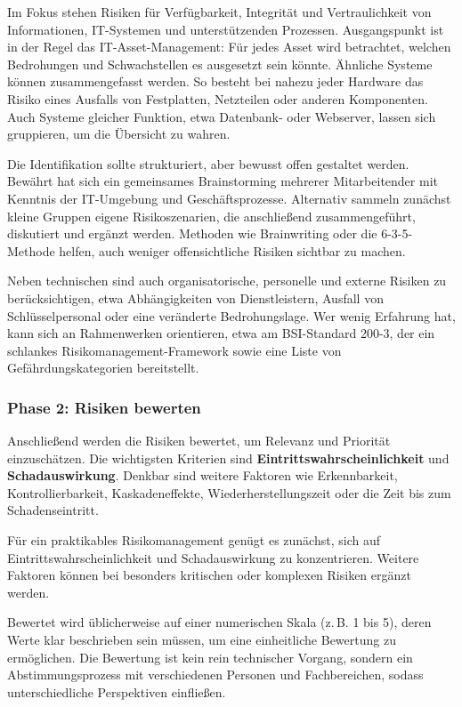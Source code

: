 Im Fokus stehen Risiken für Verfügbarkeit, Integrität und Vertraulichkeit von Informationen, IT-Systemen und unterstützenden Prozessen. Ausgangspunkt ist in der Regel das IT-Asset-Management: Für jedes Asset wird betrachtet, welchen Bedrohungen und Schwachstellen es ausgesetzt sein könnte. Ähnliche Systeme können zusammengefasst werden. So besteht bei nahezu jeder Hardware das Risiko eines Ausfalls von Festplatten, Netzteilen oder anderen Komponenten. Auch Systeme gleicher Funktion, etwa Datenbank- oder Webserver, lassen sich gruppieren, um die Übersicht zu wahren.

Die Identifikation sollte strukturiert, aber bewusst offen gestaltet werden. Bewährt hat sich ein gemeinsames Brainstorming mehrerer Mitarbeitender mit Kenntnis der IT-Umgebung und Geschäftsprozesse. Alternativ sammeln zunächst kleine Gruppen eigene Risikoszenarien, die anschließend zusammengeführt, diskutiert und ergänzt werden. Methoden wie Brainwriting oder die 6-3-5-Methode helfen, auch weniger offensichtliche Risiken sichtbar zu machen.

Neben technischen sind auch organisatorische, personelle und externe Risiken zu berücksichtigen, etwa Abhängigkeiten von Dienstleistern, Ausfall von Schlüsselpersonal oder eine veränderte Bedrohungslage. Wer wenig Erfahrung hat, kann sich an Rahmenwerken orientieren, etwa am BSI-Standard 200-3, der ein schlankes Risikomanagement-Framework sowie eine Liste von Gefährdungskategorien bereitstellt.
\newpage
\subsubsection{Phase 2: Risiken bewerten}
Anschließend werden die Risiken bewertet, um Relevanz und Priorität einzuschätzen. Die wichtigsten Kriterien sind \textbf{Eintrittswahrscheinlichkeit} und \textbf{Schadauswirkung}. Denkbar sind weitere Faktoren wie Erkennbarkeit, Kontrollierbarkeit, Kaskadeneffekte, Wiederherstellungszeit oder die Zeit bis zum Schadenseintritt.

Für ein praktikables Risikomanagement genügt es zunächst, sich auf Eintrittswahrscheinlichkeit und Schadauswirkung zu konzentrieren. Weitere Faktoren können bei besonders kritischen oder komplexen Risiken ergänzt werden.

Bewertet wird üblicherweise auf einer numerischen Skala (z.\,B. 1 bis 5), deren Werte klar beschrieben sein müssen, um eine einheitliche Bewertung zu ermöglichen. Die Bewertung ist kein rein technischer Vorgang, sondern ein Abstimmungsprozess mit verschiedenen Personen und Fachbereichen, sodass unterschiedliche Perspektiven einfließen.

